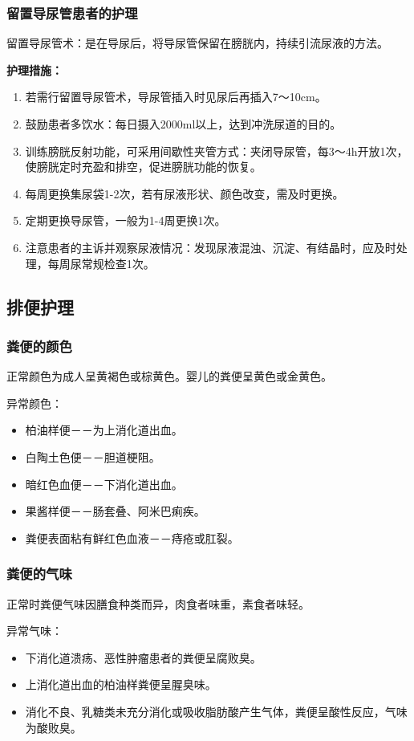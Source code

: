 \documentclass[11pt, a4paper]{ctexart}
\begin{document}
\subsubsection{留置导尿管患者的护理}
留置导尿管术：是在导尿后，将导尿管保留在膀胱内，持续引流尿液的方法。

\textbf{护理措施：}
\begin{enumerate}
    \item 若需行留置导尿管术，导尿管插入时见尿后再插入7～10cm。
    \item 鼓励患者多饮水：每日摄入2000ml以上，达到冲洗尿道的目的。
    \item 训练膀胱反射功能，可采用间歇性夹管方式：夹闭导尿管，每3～4h开放1次，使膀胱定时充盈和排空，促进膀胱功能的恢复。
    \item 每周更换集尿袋1-2次，若有尿液形状、颜色改变，需及时更换。
    \item 定期更换导尿管，一般为1-4周更换1次。
    \item 注意患者的主诉并观察尿液情况：发现尿液混浊、沉淀、有结晶时，应及时处理，每周尿常规检查1次。
\end{enumerate}

\subsection{排便护理}
\subsubsection{粪便的颜色}
正常颜色为成人呈黄褐色或棕黄色。婴儿的粪便呈黄色或金黄色。

异常颜色：
\begin{itemize}
    \item 柏油样便－－为上消化道出血。
    \item 白陶土色便－－胆道梗阻。
    \item 暗红色血便－－下消化道出血。
    \item 果酱样便－－肠套叠、阿米巴痢疾。
    \item 粪便表面粘有鲜红色血液－－痔疮或肛裂。
\end{itemize}

\subsubsection{粪便的气味}
正常时粪便气味因膳食种类而异，肉食者味重，素食者味轻。

异常气味：
\begin{itemize}
    \item 下消化道溃疡、恶性肿瘤患者的粪便呈腐败臭。
    \item 上消化道出血的柏油样粪便呈腥臭味。
    \item 消化不良、乳糖类未充分消化或吸收脂肪酸产生气体，粪便呈酸性反应，气味为酸败臭。
\end{itemize}
\end{document}
